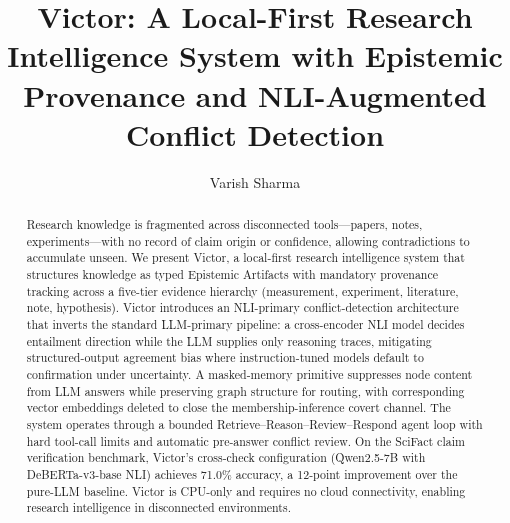 \documentclass[letterpaper]{article} %
\title{Victor: A Local-First Research Intelligence System with Epistemic Provenance and NLI-Augmented Conflict Detection}
\author{
    Varish Sharma
}
\begin{document}
\maketitle

\begin{abstract}
Research knowledge is fragmented across disconnected tools---papers, notes, experiments---with no record of claim origin or confidence, allowing contradictions to accumulate unseen. We present Victor, a local-first research intelligence system that structures knowledge as typed Epistemic Artifacts with mandatory provenance tracking across a five-tier evidence hierarchy (measurement, experiment, literature, note, hypothesis). Victor introduces an NLI-primary conflict-detection architecture that inverts the standard LLM-primary pipeline: a cross-encoder NLI model decides entailment direction while the LLM supplies only reasoning traces, mitigating structured-output agreement bias where instruction-tuned models default to confirmation under uncertainty. A masked-memory primitive suppresses node content from LLM answers while preserving graph structure for routing, with corresponding vector embeddings deleted to close the membership-inference covert channel. The system operates through a bounded Retrieve--Reason--Review--Respond agent loop with hard tool-call limits and automatic pre-answer conflict review. On the SciFact claim verification benchmark, Victor's cross-check configuration (Qwen2.5-7B with DeBERTa-v3-base NLI) achieves 71.0\% accuracy, a 12-point improvement over the pure-LLM baseline. Victor is CPU-only and requires no cloud connectivity, enabling research intelligence in disconnected environments.
\end{abstract}
\end{document}
